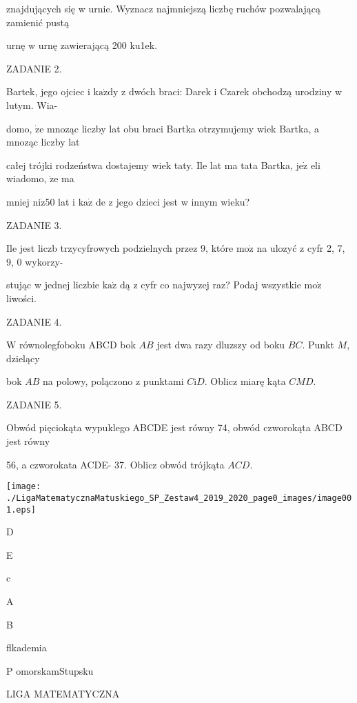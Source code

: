 \documentclass[a4paper,12pt]{article}
\begin{document}
znajdujących się w urnie. Wyznacz najmniejszą liczbę ruchów pozwalającą zamienić pustą

urnę w urnę zawierającą 200 ku1ek.

ZADANIE 2.

Bartek, jego ojciec i $\mathrm{k}\mathrm{a}\dot{\mathrm{z}}\mathrm{d}\mathrm{y}$ z dwóch braci: Darek i Czarek obchodzą urodziny w lutym. Wia-

domo, $\dot{\mathrm{z}}\mathrm{e}$ mnoząc liczby lat obu braci Bartka otrzymujemy wiek Bartka, a mnoząc liczby lat

całej trójki rodzeństwa dostajemy wiek taty. Ile lat ma tata Bartka, $\mathrm{j}\mathrm{e}\dot{\mathrm{z}}$ eli wiadomo, $\dot{\mathrm{z}}\mathrm{e}$ ma

mniej $\mathrm{n}\mathrm{i}\dot{\mathrm{z}}50$ lat i $\mathrm{k}\mathrm{a}\dot{\mathrm{z}}$ de z jego dzieci jest w innym wieku?

ZADANIE 3.

Ile jest liczb trzycyfrowych podzielnych przez 9, które $\mathrm{m}\mathrm{o}\dot{\mathrm{z}}$ na ulozyć z cyfr 2, 7, 9, 0 wykorzy-

stując w jednej liczbie $\mathrm{k}\mathrm{a}\dot{\mathrm{z}}$ dą z cyfr co najwyzej raz? Podaj wszystkie $\mathrm{m}\mathrm{o}\dot{\mathrm{z}}$ liwości.

ZADANIE 4.

$\mathrm{W}$ równolegfoboku ABCD bok $AB$ jest dwa razy dluzszy od boku $BC$. Punkt $M$, dzielący

bok $AB$ na polowy, polączono z punktami $C\mathrm{i}D$. Oblicz miarę kąta $CMD.$

ZADANIE 5.

Obwód pięciokąta wypuklego ABCDE jest równy 74, obwód czworokąta ABCD jest równy

56, a czworokata ACDE- 37. Oblicz obwód trójkąta $ACD.$
\begin{center}
\texttt{[image: ./LigaMatematycznaMatuskiego\_SP\_Zestaw4\_2019\_2020\_page0\_images/image001.eps]}
\end{center}
D

E

c

A

B






flkademia

P omorskamStupsku

LIGA MATEMATYCZNA
\end{document}
